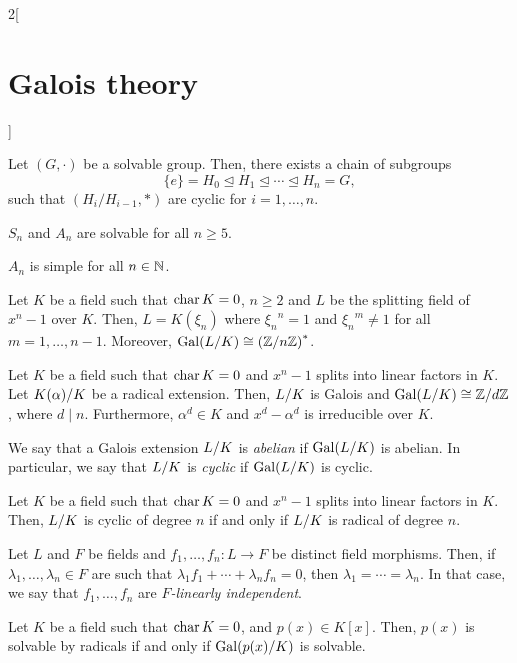 \documentclass[../../../main.tex]{subfiles}
\begin{document}
\begin{multicols}{2}[\section{Galois theory}]
  \begin{prop}
    Let $(G,\cdot)$ be a solvable group. Then, there exists a chain of subgroups $$\{e\}=H_0\unlhd H_1\unlhd\cdots\unlhd H_n=G,$$ such that $(H_i/H_{i-1},*)$ are cyclic for $i=1,\ldots,n$.
  \end{prop}
  \begin{theorem}
    $S_n$ and $A_n$ are solvable for all $n\geq 5$.
  \end{theorem}
  \begin{theorem}
    $A_n$ is simple for all $n\in\mathbb{N}$.
  \end{theorem}
  \begin{prop}
    Let $K$ be a field such that $\operatorname{char} K=0$, $n\geq 2$ and $L$ be the splitting field of $x^n-1$ over $K$. Then, $L=K(\xi_n)$ where ${\xi_n}^n=1$ and ${\xi_n}^m\ne 1$ for all $m=1,\ldots,n-1$. Moreover, $\Gal(\quot{L}{K})\cong{(\quot{\ZZ}{n\ZZ})}^*$.
  \end{prop}
  \begin{prop}
    Let $K$ be a field such that $\operatorname{char} K=0$ and $x^n-1$ splits into linear factors in $K$. Let $\quot{K(\alpha)}{K}$ be a radical extension. Then, $\quot{L}{K}$ is Galois and $\Gal(\quot{L}{K})\cong\quot{\ZZ}{d\ZZ}$, where $d\mid n$. Furthermore, $\alpha^d\in K$ and $x^d-\alpha^d$ is irreducible over $K$.
  \end{prop}
  \begin{definition}
    We say that a Galois extension $\quot{L}{K}$ is \textit{abelian} if $\Gal(\quot{L}{K})$ is abelian. In particular, we say that $\quot{L}{K}$ is \textit{cyclic} if $\Gal(\quot{L}{K})$ is cyclic.
  \end{definition}
  \begin{theorem}
    Let $K$ be a field such that $\operatorname{char} K=0$ and $x^n-1$ splits into linear factors in $K$. Then, $\quot{L}{K}$ is cyclic of degree $n$ if and only if $\quot{L}{K}$ is radical of degree $n$.
  \end{theorem}
  \begin{lemma}
    Let $L$ and $F$ be fields and $f_1,\ldots,f_n:L\rightarrow F$ be distinct field morphisms. Then, if $\lambda_1,\ldots,\lambda_n\in F$ are such that $\lambda_1f_1+\cdots+\lambda_nf_n=0$, then $\lambda_1=\cdots=\lambda_n$. In that case, we say that $f_1,\ldots,f_n$ are \textit{$F$-linearly independent}.
  \end{lemma}


  \begin{theorem}
    Let $K$ be a field such that $\operatorname{char} K=0$, and $p(x)\in K[x]$. Then, $p(x)$ is solvable by radicals if and only if $\Gal(\quot{p(x)}{K})$ is solvable.
  \end{theorem}
\end{multicols}
\end{document}
